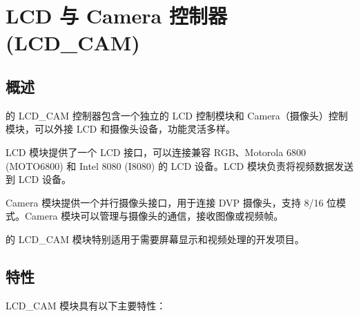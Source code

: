 \documentclass[main\_\_CN.tex]{subfiles}
\begin{document}

\ifglobal
\else
    {\let\clearpage\relax \listoftodos}
    {\let\clearpage\relax \listofdonetodos}
    \tableofcontents
\fi


\hypertarget{camlcdctrl}{}
\chapter{LCD 与 Camera 控制器 (LCD\_CAM)}
\label{mod:camlcdctrl}

\section{概述}

\chipname{} 的 LCD\_CAM 控制器包含一个独立的 LCD 控制模块和 Camera（摄像头）控制模块，可以外接 LCD 和摄像头设备，功能灵活多样。

LCD 模块提供了一个 LCD 接口，可以连接兼容 RGB、Motorola 6800 (MOTO6800) 和 Intel 8080 (I8080) 的 LCD 设备。LCD 模块负责将视频数据发送到 LCD 设备。

Camera 模块提供一个并行摄像头接口，用于连接 DVP 摄像头，支持 8/16 位模式。Camera 模块可以管理与摄像头的通信，接收图像或视频帧。

\chipname{} 的 LCD\_CAM 模块特别适用于需要屏幕显示和视频处理的开发项目。

\section{特性}

LCD\_CAM 模块具有以下主要特性：
\end{document}
